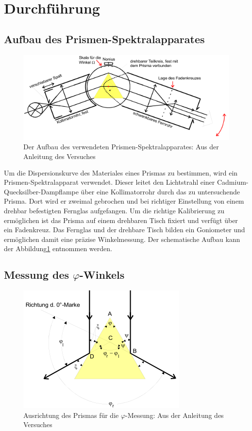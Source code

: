 \section{Durchführung}
\label{sec:Durchführung}
\subsection{Aufbau des Prismen-Spektralapparates}

\begin{figure}
  \centering
  \includegraphics[scale=0.7]{images/Aufbau.png}
  \caption{Der Aufbau des verwendeten Prismen-Spektralapparates: Aus der Anleitung des Versuches \cite[24]{1}}
  \label{fig:aufbau}
\end{figure}

Um die Dispersionskurve des Materiales eines Prismas zu bestimmen, wird ein Prismen-Spektralapparat verwendet.
Dieser leitet den Lichtstrahl einer Cadmium-Quecksilber-Dampflampe über eine Kollimatorrohr durch das zu untersuchende Prisma.
Dort wird er zweimal gebrochen und bei richtiger Einstellung von einem drehbar befestigten Fernglas aufgefangen.
Um die richtige Kalibrierung zu ermöglichen ist das Prisma auf einem drehbaren Tisch fixiert und verfügt über ein Fadenkreuz.
Das Fernglas und der drehbare Tisch bilden ein Goniometer und ermöglichen damit eine präzise Winkelmessung.
Der schematische Aufbau kann der Abbildung\ref{fig:aufbau} entnommen werden.

\subsection{Messung des \texorpdfstring{$\varphi$}{phi}-Winkels}

\begin{figure}[H]
  \centering
  \includegraphics[scale=0.6]{images/Phi.png}
  \caption{Ausrichtung des Prismas für die $\varphi$-Messung: Aus der Anleitung des Versuches \cite[26]{1}}
  \label{fig:Phi}
\end{figure}

